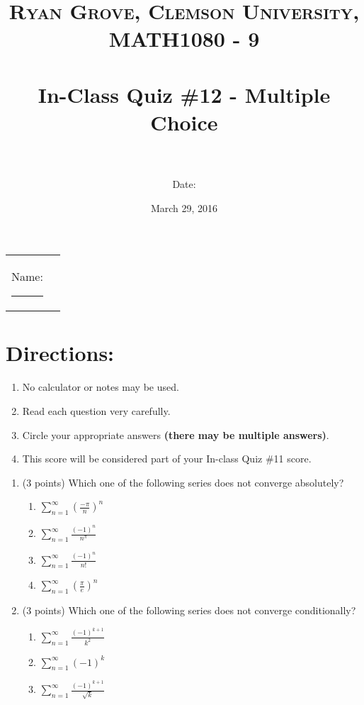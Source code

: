 \documentclass[paper=a4, fontsize=11pt]{scrartcl} %
\title{	
\normalfont \normalsize 
\textsc{Ryan Grove, Clemson University, MATH1080 - 9} \\ [25pt] %
\horrule{0.5pt} \\[0.4cm] %
\huge In-Class Quiz \#12 - Multiple Choice \\ %
\horrule{2pt} \\[0.5cm] %
}
\author{Date:} %
\date{\normalsize March 29, 2016} %
\numberwithin{equation}{section} %
\numberwithin{figure}{section} %
\numberwithin{table}{section} %
\begin{document}
\maketitle %

\begin{flushleft}
\begin{tabular}{l l}
Name: \rule{3.2in}{.01cm}  & {}%
\end{tabular}
\end{flushleft}


\section*{\textbf{Directions:}}
\begin{enumerate}
\item No calculator or notes may be used.
\item Read each question very carefully.
\item Circle your appropriate answers \textbf{(there may be multiple answers)}.
\item This score will be considered part of your In-class Quiz \#11 score.
\end{enumerate}
    \vspace{0.5in}
\newpage
\begin{enumerate}
\item (3 points) Which one of the following series does not converge absolutely?
\vspace{2mm}
 \normalsize \begin{enumerate}
    \item $\sum\limits_{n=1}^\infty \left( \frac{-\pi}{n} \right)^n$
    \item $\sum\limits_{n=1}^\infty \frac{(-1)^n}{n^\pi} $
    \item $\sum\limits_{n=1}^\infty \frac{(-1)^n}{n!} $
    \item $\sum\limits_{n=1}^\infty \left( \frac{\pi}{e} \right)^n$
  \end{enumerate}
  \vspace{2in}
\item (3 points) Which one of the following series does not converge conditionally?
\vspace{2mm}
 \normalsize \begin{enumerate}
    \item $\sum\limits_{n=1}^\infty \frac{(-1)^{k+1}}{k^2}$
    \item $\sum\limits_{n=1}^\infty (-1)^{k}$
    \item $\sum\limits_{n=1}^\infty \frac{(-1)^{k+1}}{\sqrt{k}}$
  \end{enumerate}

\end{enumerate}




\end{document}
